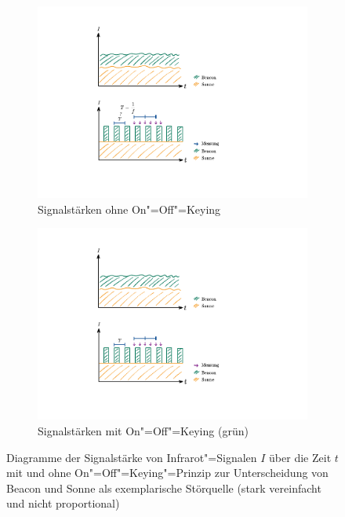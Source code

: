 \begin{figure}[h]
    \centering
    \begin{subfigure}{0.8\textwidth}
        \centering
        \includegraphics[width=\textwidth]{../assets/on-off-keying-1.pdf}
        \caption{Signalstärken ohne On"=Off"=Keying}
    \end{subfigure}
    \hspace{0.5cm}
    \begin{subfigure}{0.8\textwidth}
        \includegraphics[width=\textwidth]{../assets/on-off-keying-2.pdf}
        \caption{Signalstärken mit On"=Off"=Keying (grün)}
    \end{subfigure}
    \caption{Diagramme der Signalstärke von Infrarot"=Signalen $I$ über die Zeit $t$ mit und ohne On"=Off"=Keying"=Prinzip zur Unterscheidung von Beacon und Sonne als exemplarische Störquelle (stark vereinfacht und nicht proportional)}
    \label{fig:on-off-keying}
\end{figure}

